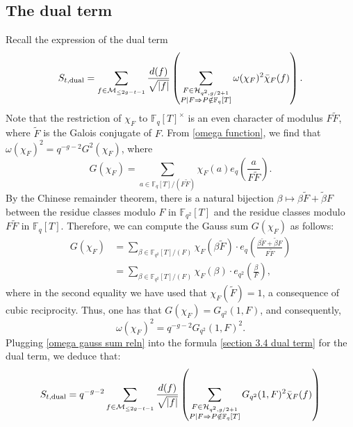 \documentclass[table]{amsart}
\newcommand{\F}{\mathbb{F}}
\newcommand{\cM}{\mathcal{M}}
\numberwithin{equation}{section}
\begin{document}
\subsection{The dual term}\label{dual term section}
Recall the expression of the dual term
\begin{equation}\label{section 3.4 dual term}S_{t, \rm{dual}}=\sum_{f\in \cM_{\leq 2g-t-1}}  \frac{d(f)}{\sqrt{|f|}}\left(\sum_{\substack{F \in \mathcal{H}_{q^{2}, g / 2+1} \\ P \mid F \Rightarrow P \notin \mathbb{F}_{q}[T]}} \omega(\chi_F)^2\bar{\chi}_F(f)\right).\end{equation}
Note that the restriction of $\chi_F$ to $\mathbb{F}_{q}[T]^\times$ is an even character of modulus $F\tilde{F}$, where $\tilde{F}$ is the Galois conjugate of $F$. From \eqref{omega function}, we find that $\omega(\chi_{F})^{2}=q^{-g-2}G^{2}(\chi_{F})$, where
\[
G(\chi_{F}) = \sum_{a \in \mathbb{F}_{q}[T]/(F\tilde{F})} \chi_{F}(a) e_q \left(\frac{a}{F\tilde{F}} \right).
\] 
By the Chinese remainder theorem, there is a natural bijection
$
\beta \mapsto \beta \tilde{F} + \tilde{\beta} F
$ between the residue classes modulo $F$ in $\F_{q^2}[T]$ and the residue classes modulo $F\tilde{F}$ in $\F_q[T]$. Therefore, we can compute the Gauss sum $G(\chi_F)$ as follows:
$$
\begin{aligned}
G(\chi_F) &= \sum_{\beta \in \F_{q^2}[T]/(F)} \chi_F(\beta \tilde{F}) \cdot e_q\left( \frac{\beta \tilde{F} + \tilde{\beta} F}{F\tilde{F}} \right) \\
&= \sum_{\beta \in \F_{q^2}[T]/(F)} \chi_F(\beta) \cdot e_{q^2}\left( \frac{\beta}{F} \right),
\end{aligned}
$$
\noindent where in the second equality we have used that $\chi_F(\tilde{F}) = 1$, a consequence of cubic reciprocity. Thus, one has that $G(\chi_F) = G_{q^2}(1, F)$,
and consequently, \begin{equation}\label{omega gauss sum reln}\omega(\chi_F)^2=q^{-g-2} G_{q^2}(1, F)^2.\end{equation}
Plugging \eqref{omega gauss sum reln} into the formula \eqref{section 3.4 dual term} for the dual term, we deduce that:
\begin{equation}\label{S t dual eqn}S_{t, \rm{dual}}=q^{-g-2}\sum_{f\in \cM_{\leq 2g-t-1}}  \frac{d(f)}{\sqrt{|f|}}\left(\sum_{\substack{F \in \mathcal{H}_{q^{2}, g / 2+1} \\ P \mid F \Rightarrow P \notin \mathbb{F}_{q}[T]}}  G_{q^2}(1,F)^2\bar{\chi}_F(f)\right)\end{equation}
\end{document}
